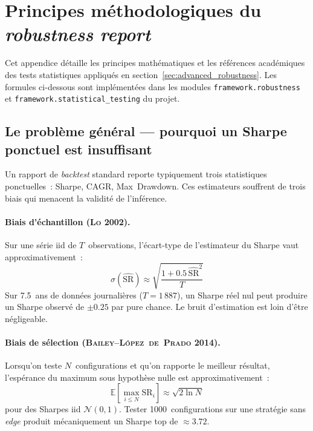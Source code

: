 \section{Principes méthodologiques du \textit{robustness report}}
\label{app:robustness_methodology}

Cet appendice détaille les principes mathématiques et les références académiques des tests statistiques appliqués en section~\ref{sec:advanced_robustness}. Les formules ci-dessous sont implémentées dans les modules \texttt{framework.robustness} et \texttt{framework.statistical\_testing} du projet.

\subsection{Le problème général --- pourquoi un Sharpe ponctuel est insuffisant}
\label{app:robustness_problem}

Un rapport de \emph{backtest} standard reporte typiquement trois statistiques ponctuelles~: Sharpe, CAGR, Max~Drawdown. Ces estimateurs souffrent de trois biais qui menacent la validité de l'inférence.

\paragraph{Biais d'échantillon (\textsc{Lo} 2002).} Sur une série iid de $T$~observations, l'écart-type de l'estimateur du Sharpe vaut approximativement~:
\begin{equation}
\sigma(\widehat{\mathrm{SR}}) \approx \sqrt{\frac{1 + 0.5\,\widehat{\mathrm{SR}}^{2}}{T}}
\label{eq:lo_sharpe_std}
\end{equation}
Sur 7.5~ans de données journalières ($T = 1\,887$), un Sharpe réel nul peut produire un Sharpe observé de $\pm 0.25$ par pure chance. Le bruit d'estimation est loin d'être négligeable.

\paragraph{Biais de sélection (\textsc{Bailey--L\'opez~de~Prado} 2014).} Lorsqu'on teste $N$~configurations et qu'on rapporte le meilleur résultat, l'espérance du maximum sous hypothèse nulle est approximativement~:
\begin{equation}
\mathbb{E}\left[\max_{i \leq N} \mathrm{SR}_{i}\right] \approx \sqrt{2 \ln N}
\label{eq:extreme_value_max_sharpe}
\end{equation}
pour des Sharpes iid $\mathcal{N}(0, 1)$. Tester 1000~configurations sur une stratégie sans \emph{edge} produit mécaniquement un Sharpe top de $\approx 3.72$.

